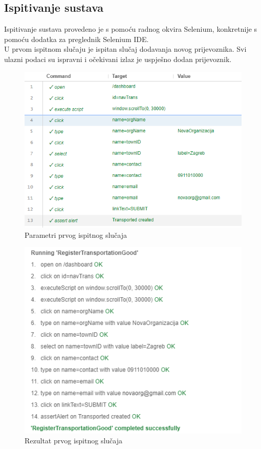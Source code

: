			\subsection{Ispitivanje sustava}
			Ispitivanje sustava provedeno je s pomoću radnog okvira Selenium, konkretnije s pomoću dodatka za preglednik Selenium IDE. 
			\\U prvom ispitnom slučaju je ispitan slučaj dodavanja novog prijevoznika. Svi ulazni podaci su ispravni i očekivani izlaz je uspješno dodan prijevoznik.
			\begin{figure}[H]
				\centering
				\includegraphics[width=\textwidth]{"slike/Selenium/transport testovi/registerTransportationGood_parameters.png"}
				\caption{Parametri prvog ispitnog slučaja}
				\label{fig: registerTransportationGood_parameters}
			\end{figure}
			\begin{figure}[H]
				\centering
				\includegraphics[width=\textwidth]{"slike/Selenium/transport testovi/registerTransportationGood_results.png"}
				\caption{Rezultat prvog ispitnog slučaja}
				\label{fig: registerTransportationGood_result}
			\end{figure}
